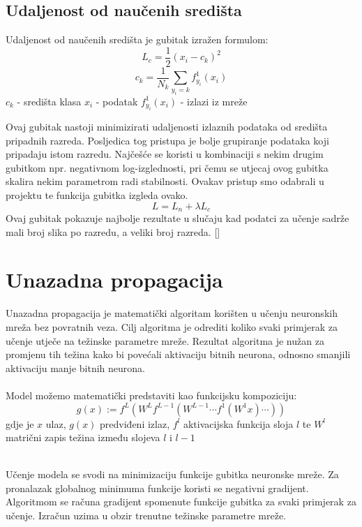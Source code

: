 \subsection{Udaljenost od naučenih središta}
	Udaljenost od naučenih središta je gubitak izražen formulom:
	\[
		L_c = \frac{1}{2} (x_i-c_k)^2
	\]
	\[
		c_k = \frac{1}{N_k}\sum_{y_i=k}f_{y_i}^1(x_i)
	\]
	$c_k$ - središta klasa
	\newline
	$x_i$ - podatak
	\newline
	$f_{y_i}^1(x_i)$ - izlazi iz mreže
	\newline
	
Ovaj gubitak nastoji minimizirati udaljenosti izlaznih podataka od središta pripadnih razreda. Posljedica tog pristupa je bolje grupiranje podataka koji pripadaju istom razredu. Najčešće se koristi u kombinaciji s nekim drugim gubitkom npr. negativnom log-izglednosti, pri čemu se utjecaj ovog gubitka skalira nekim parametrom radi stabilnosti. Ovakav pristup smo odabrali u projektu te funkcija gubitka izgleda ovako.
\[
	L = L_n + \lambda L_c
\]
 Ovaj gubitak pokazuje najbolje rezultate u slučaju kad podatci za učenje sadrže mali broj slika po razredu, a veliki broj razreda. [\cite{centerloss}]
	 


\section{Unazadna propagacija}

Unazadna propagacija je matematički algoritam korišten u učenju neuronskih mreža bez povratnih veza. Cilj algoritma je odrediti koliko svaki primjerak za učenje utječe na težinske parametre mreže. Rezultat algoritma je nužan za promjenu tih težina kako bi povećali aktivaciju bitnih neurona, odnosno smanjili aktivaciju manje bitnih neurona.\\\\Model možemo matematički predstaviti kao funkcijsku kompoziciju:
	\[g(x):=f^{L}(W^{L}f^{L-1}(W^{L-1}\cdots f^{1}(W^{1}x)\cdots ))\]
	gdje je \(x\) ulaz, \(g(x)\) predviđeni izlaz, \(f^l\) aktivacijska funkcija sloja \(l\) te \(W^l\) matrični zapis težina između slojeva \(l\) i \(l-1\)
	
	\noindent\\Učenje modela se svodi na minimizaciju funkcije gubitka neuronske mreže. Za pronalazak globalnog minimuma funkcije koristi se negativni gradijent. Algoritmom se računa gradijent spomenute funkcije gubitka za svaki primjerak za učenje. Izračun uzima u obzir trenutne težinske parametre mreže.
	
